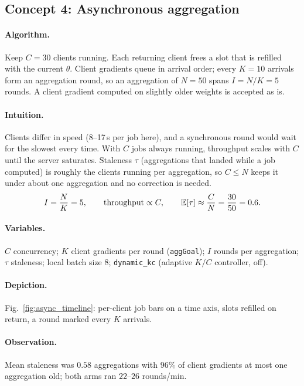 \subsection{Concept 4: Asynchronous aggregation}
\paragraph{Algorithm.}
Keep $C{=}30$ clients running. Each returning client frees a slot that is refilled with the current $\theta$.
Client gradients queue in arrival order; every $K{=}10$ arrivals form an aggregation round, so an aggregation of $N{=}50$ spans $I=N/K=5$ rounds.
A client gradient computed on slightly older weights is accepted as is.
\paragraph{Intuition.}
Clients differ in speed (8--17\,s per job here), and a synchronous round would wait for the slowest every time.
With $C$ jobs always running, throughput scales with $C$ until the server saturates. Staleness $\tau$ (aggregations that landed
while a job computed) is roughly the clients running per aggregation, so $C\le N$ keeps it under about one aggregation and no correction is needed.
\begin{equation}
I=\frac NK=5,\qquad \text{throughput}\propto C,\qquad \mathbb{E}[\tau]\approx\frac CN=\frac{30}{50}=0.6 .
\end{equation}
\paragraph{Variables.}
$C$ concurrency; $K$ client gradients per round (\texttt{aggGoal}); $I$ rounds per aggregation; $\tau$ staleness; local batch size $8$; \texttt{dynamic\_kc} (adaptive $K/C$ controller, off).
\paragraph{Depiction.} Fig.~\ref{fig:async_timeline}: per-client job bars on a time axis, slots refilled on return, a round marked every $K$ arrivals.
\paragraph{Observation.}
Mean staleness was $0.58$ aggregations with $96\%$ of client gradients at most one aggregation old; both arms ran $22$--$26$ rounds/min.

